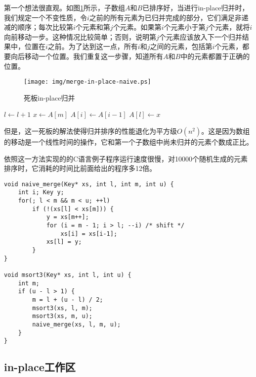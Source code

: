 \documentclass[UTF8]{article}
\begin{document}
第一个想法很直观。如图\ref{fig:merge-in-place-naive}所示，子数组$A$和$B$已排序好，当进行in-place归并时，我们规定一个不变性质，令$i$之前的所有元素为已归并完成的部分，它们满足非递减的顺序；每次比较第$i$个元素和第$j$个元素。如果第$i$个元素小于第$j$个元素，就将$i$向前移动一步。这种情况比较简单；否则，说明第$j$个元素应该放入下一个归并结果中，位置在$i$之前。为了达到这一点，所有$i$和$j$之间的元素，包括第$i$个元素，都要向后移动一个位置。我们重复这一步骤，知道所有$A$和$B$中的元素都置于正确的位置。

\begin{figure}[htbp]
 \centering
 \texttt{[image: img/merge-in-place-naive.ps]}
 \caption{死板in-place归并}
 \label{fig:merge-in-place-naive}
\end{figure}

\begin{algorithmic}[1]
      \State $l \gets l + 1$
    \Else
      \State $x \gets A[m]$
       
        \State $A[i] \gets A[i-1]$
      \EndFor
      \State $A[l] \gets x$
    \EndIf
  \EndWhile
\EndProcedure
\end{algorithmic}

但是，这一死板的解法使得归并排序的性能退化为平方级$O(n^2)$。这是因为数组的移动是一个线性时间的操作，它和第一个子数组中尚未归并的元素个数成正比。

依照这一方法实现的的C语言例子程序运行速度很慢，对10000个随机生成的元素排序时，它消耗的时间比前面给出的程序多12倍。

\lstset{language=C}
\begin{lstlisting}
void naive_merge(Key* xs, int l, int m, int u) {
    int i; Key y;
    for(; l < m && m < u; ++l)
        if (!(xs[l] < xs[m])) {
            y = xs[m++];
            for (i = m - 1; i > l; --i) /* shift */
                xs[i] = xs[i-1];
            xs[l] = y;
        }
}

void msort3(Key* xs, int l, int u) {
    int m;
    if (u - l > 1) {
        m = l + (u - l) / 2;
        msort3(xs, l, m);
        msort3(xs, m, u);
        naive_merge(xs, l, m, u);
    }
}
\end{lstlisting}

\subsection{in-place工作区}
\end{document}
